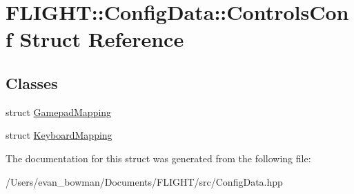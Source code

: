 \hypertarget{struct_f_l_i_g_h_t_1_1_config_data_1_1_controls_conf}{}\section{F\+L\+I\+G\+HT\+:\+:Config\+Data\+:\+:Controls\+Conf Struct Reference}
\label{struct_f_l_i_g_h_t_1_1_config_data_1_1_controls_conf}
\subsection*{Classes}
\begin{DoxyCompactItemize}
\item 
struct \hyperlink{struct_f_l_i_g_h_t_1_1_config_data_1_1_controls_conf_1_1_gamepad_mapping}{Gamepad\+Mapping}
\item 
struct \hyperlink{struct_f_l_i_g_h_t_1_1_config_data_1_1_controls_conf_1_1_keyboard_mapping}{Keyboard\+Mapping}
\end{DoxyCompactItemize}


The documentation for this struct was generated from the following file\+:\begin{DoxyCompactItemize}
\item 
/\+Users/evan\+\_\+bowman/\+Documents/\+F\+L\+I\+G\+H\+T/src/Config\+Data.\+hpp\end{DoxyCompactItemize}
